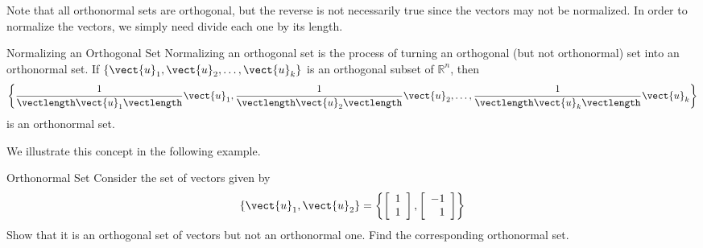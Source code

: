 Note that all orthonormal sets are orthogonal, but the reverse is not
necessarily true since the vectors may not be normalized. In order to
normalize the vectors, we simply need divide each one by its length.

\begin{definition}{Normalizing an Orthogonal Set}\label{def:normalizing}
Normalizing an orthogonal set is the process of 
turning an orthogonal (but not orthonormal) set into
an orthonormal set.
If $\{ \vect{u}_1, \vect{u}_2, \ldots, \vect{u}_k\}$
is an orthogonal subset of $\mathbb{R}^n$, 
then 
\[ \left\{
\frac{1}{\vectlength\vect{u}_1\vectlength}\vect{u}_1,
\frac{1}{\vectlength\vect{u}_2\vectlength}\vect{u}_2, \ldots,
\frac{1}{\vectlength\vect{u}_k\vectlength}\vect{u}_k \right\}
\]
is an orthonormal set.
\end{definition}

We illustrate this concept in the following example. 

\begin{example}{Orthonormal Set}\label{exa:orthonormalset}
Consider the set of vectors  given by 
\[
\left\{ \vect{u}_1, \vect{u}_2 \right\} = \left\{
\left[
\begin{array}{c}
1 \\
1 
\end{array}
\right], 
\left[
\begin{array}{r}
-1 \\
1
\end{array}
\right]
\right\}
\]
Show that it is an orthogonal set of vectors  but not an orthonormal one. Find the corresponding orthonormal set. 
\end{example}

